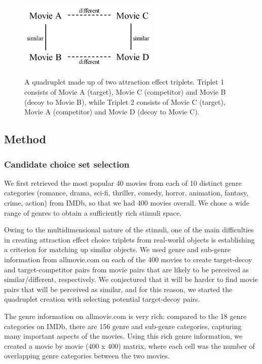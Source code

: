 \documentclass[12pt, a4paper]{article}
\begin{document}
 \begin{figure}
\centering
\captionsetup{justification=centering}
\caption{A quadruplet made up of two attraction effect triplets. Triplet 1 consists of Movie A (target), Movie C (competitor) and Movie B (decoy to Movie B), while Triplet 2 consists of Movie C (target), Movie A (competitor) and Movie D (decoy to Movie C).}
\includegraphics[width=0.6\textwidth]{quadruplets.png}
\label{fig:quadruplets}
\end{figure}

\subsection{Method}

\subsubsection{Candidate choice set selection}

We first retrieved the most popular 40 movies from each of 10 distinct genre categories (romance, drama, sci-fi, thriller, comedy, horror, animation, fantasy, crime, action) from IMDb, so that we had 400 movies overall. We chose a wide range of genres to obtain a sufficiently rich stimuli space. 

Owing to the multidimensional nature of the stimuli, one of the main difficulties in creating attraction effect choice triplets from real-world objects is establishing a criterion for matching up similar objects. We used genre and sub-genre information from allmovie.com on each of the 400 movies to create target-decoy and target-competitor pairs from movie pairs that are likely to be perceived as similar/different, respectively. We conjectured that it will be harder to find movie pairs that will be perceived as similar, and for this reason, we started the quadruplet creation with selecting potential target-decoy pairs.

 The genre information on allmovie.com is very rich: compared to the 18 genre categories on IMDb, there are 156 genre and sub-genre categories, capturing many important aspects of the movies. Using this rich genre information, we created a movie by movie (400 x 400) matrix, where each cell was the number of overlapping genre categories between the two movies. 
\end{document}
